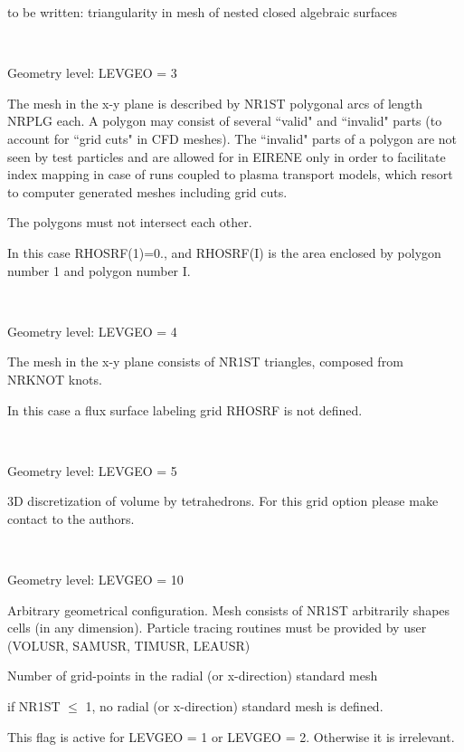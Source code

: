 \begin{description}
        to be written: triangularity in mesh of nested closed algebraic surfaces
  \item[NLPLG = .TRUE.
        ] ~

        Geometry level: LEVGEO = 3 

        The mesh in the x-y plane is described by NR1ST polygonal arcs of length NRPLG
        each.
        A polygon may consist of several ``valid" and ``invalid" parts (to account for
        ``grid cuts" in \ac{CFD} meshes).
        The ``invalid" parts of a polygon are not seen by test particles and are
        allowed for in EIRENE only in order to facilitate index mapping in case of runs
        coupled to plasma transport models, which resort to computer generated meshes
        including grid cuts.

        The polygons must not intersect each other.

        In this case RHOSRF(1)=0., and RHOSRF(I) is the area enclosed by polygon number
        1 and polygon number I.
  \item[NLFEM = .TRUE.
        ] ~

        Geometry level: LEVGEO = 4 

        The mesh in the x-y plane consists of NR1ST triangles, composed from NRKNOT
        knots.

        In this case a flux surface labeling grid RHOSRF is not defined.
  \item[NLTET = .TRUE.
        ] ~

        Geometry level: LEVGEO = 5 

        3D discretization of volume by tetrahedrons.
        For this grid option please make contact to the authors.
  \item[NLGEN = .TRUE.
        ] ~

        Geometry level: LEVGEO = 10 

        Arbitrary geometrical configuration.
        Mesh consists of NR1ST arbitrarily shapes cells (in any dimension).
        Particle tracing routines must be provided by user (VOLUSR, SAMUSR, TIMUSR,
        LEAUSR) 

        \medskip 

  \item[NR1ST] Number of grid-points in the radial (or x-direction) standard mesh

        if NR1ST $\le$ 1, no radial (or x-direction) standard mesh is defined.
  \item[NRSEP] This flag is active for LEVGEO = 1 or LEVGEO = 2.
        Otherwise it is irrelevant.


\end{description}
